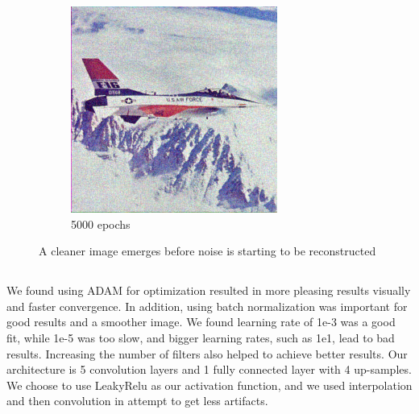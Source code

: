 \documentclass[12pt]{article}
\begin{document}
\begin{figure}[h!]
\begin{subfigure}[b]{0.4\linewidth}
    \includegraphics[width=\linewidth]{overfit1d.png}
    \caption{5000 epochs}
  \end{subfigure}
  \caption{A cleaner image emerges before noise is starting to be reconstructed}
  \label{fig:epoch_compare_1d}
\end{figure}

\subsection{}
We found using ADAM for optimization resulted in more pleasing results visually and faster convergence. In addition, using batch normalization was important for good results and a smoother image. We found learning rate of 1e-3 was a good fit, while 1e-5 was too slow, and bigger learning rates, such as 1e1, lead to bad results.
Increasing the number of filters also helped to achieve better results.
Our architecture is  5 convolution layers and 1 fully connected layer with 4 up-samples. We choose to use LeakyRelu as our activation function, and we used interpolation and then convolution in attempt to get less artifacts.
\end{document}
